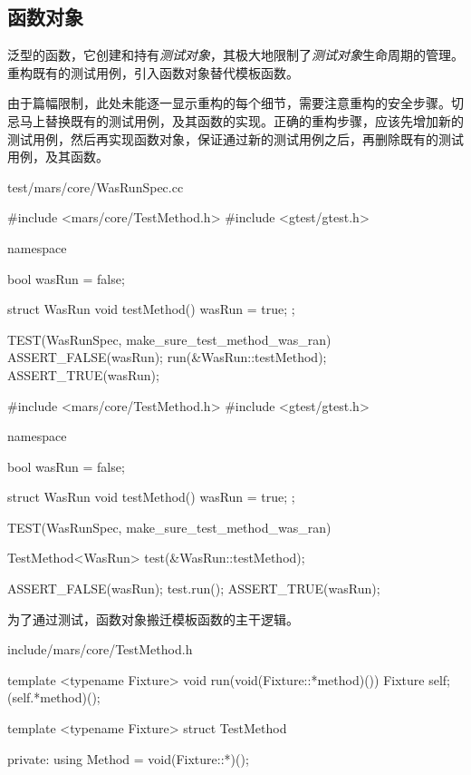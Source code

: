 \begin{content}
\subsection{函数对象}

泛型的函数，它创建和持有\emph{测试对象}，其极大地限制了\emph{测试对象}生命周期的管理。重构既有的测试用例，引入函数对象替代模板函数。

由于篇幅限制，此处未能逐一显示重构的每个细节，需要注意重构的安全步骤。切忌马上替换既有的测试用例，及其函数的实现。正确的重构步骤，应该先增加新的测试用例，然后再实现函数对象，保证通过新的测试用例之后，再删除既有的测试用例，及其函数。

\begin{diff}{test/mars/core/WasRunSpec.cc}
\begin{minicpp}
#include <mars/core/TestMethod.h>
#include <gtest/gtest.h>

namespace {
  bool wasRun = false;

  struct WasRun {
    void testMethod() {
      wasRun = true;
    }
  };
}

TEST(WasRunSpec, make_sure_test_method_was_ran) {
  ASSERT_FALSE(wasRun);
  run(&WasRun::testMethod);
  ASSERT_TRUE(wasRun);
}
\end{minicpp}
\tcblower
\begin{minicpp}
#include <mars/core/TestMethod.h>
#include <gtest/gtest.h>

namespace {
  bool wasRun = false;

  struct WasRun {
    void testMethod() {
      wasRun = true;
    }
  };
}

TEST(WasRunSpec, make_sure_test_method_was_ran) {
  TestMethod<WasRun> test(&WasRun::testMethod);

  ASSERT_FALSE(wasRun);
  test.run();
  ASSERT_TRUE(wasRun);
}
\end{minicpp}
\end{diff}

为了通过测试，函数对象搬迁模板函数的主干逻辑。

\begin{diff}{include/mars/core/TestMethod.h}
\begin{minicpp}
template <typename Fixture>
void run(void(Fixture::*method)()) {
  Fixture self;
  (self.*method)();
}
\end{minicpp}
\tcblower
\begin{minicpp}
template <typename Fixture>
struct TestMethod {
private:
  using Method = void(Fixture::*)();

}
\end{minicpp}
\end{diff}
\end{content}

